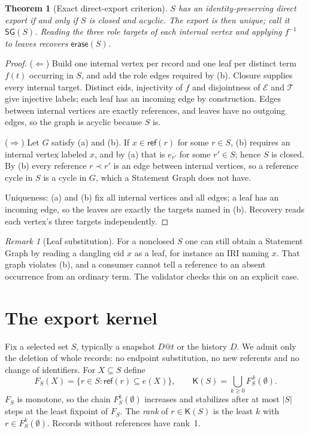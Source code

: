 \documentclass[11pt]{article}
\theoremstyle{plain}
\newtheorem{theorem}{Theorem}
\theoremstyle{definition}
\theoremstyle{remark}
\newtheorem{remark}{Remark}
\newcommand{\Stmt}{\mathcal E}
\newcommand{\Term}{\mathcal T}
\newcommand{\SG}{\mathsf{SG}}
\newcommand{\refs}{\prec}
\newcommand{\Kernel}{\mathsf{K}}
\newcommand{\Erase}{\mathsf{erase}}
\newcommand{\refset}{\mathsf{ref}}
\begin{document}
\begin{theorem}[Exact direct-export criterion]\label{thm:criterion}
$S$ has an identity-preserving direct export if and only if $S$ is closed and
acyclic. The export is then unique; call it $\SG(S)$. Reading the three role
targets of each internal vertex and applying $f^{-1}$ to leaves recovers
$\Erase(S)$.
\end{theorem}
\begin{proof}
($\Leftarrow$) Build one internal vertex per record and one leaf per distinct term
$f(t)$ occurring in $S$, and add the role edges required by (b). Closure supplies
every internal target. Distinct eids, injectivity of $f$ and disjointness of $\Stmt$
and $\Term$ give injective labels; each leaf has an incoming edge by construction.
Edges between internal vertices are exactly references, and leaves have no
outgoing edges, so the graph is acyclic because $S$ is.

($\Rightarrow$) Let $G$ satisfy (a) and (b). If $x\in\refset(r)$ for some $r\in S$,
(b) requires an internal vertex labeled $x$, and by (a) that is $e_{r'}$ for some
$r'\in S$; hence $S$ is closed. By (b) every reference $r\refs r'$ is an edge
between internal vertices, so a reference cycle in $S$ is a cycle in $G$, which a
Statement Graph does not have.

Uniqueness: (a) and (b) fix all internal vertices and all edges; a leaf has an
incoming edge, so the leaves are exactly the targets named in (b). Recovery reads
each vertex's three targets independently.
\end{proof}

\begin{remark}[Leaf substitution]
For a nonclosed $S$ one can still obtain a Statement Graph by reading a dangling eid
$x$ as a leaf, for instance an IRI naming $x$. That graph violates (b), and a
consumer cannot tell a reference to an absent occurrence from an ordinary term. The
validator checks this on an explicit case.
\end{remark}

\section{The export kernel}\label{sec:kernel}
Fix a selected set $S$, typically a snapshot $D@t$ or the history $D$. We admit
only the deletion of whole records: no endpoint substitution, no new referents and
no change of identifiers. For $X\subseteq S$ define
\[
F_S(X)=\{r\in S:\refset(r)\subseteq e(X)\},
\qquad
\Kernel(S)=\bigcup_{k\ge0}F_S^{\,k}(\emptyset).
\]
$F_S$ is monotone, so the chain $F_S^k(\emptyset)$ increases and stabilizes after at
most $|S|$ steps at the least fixpoint of $F_S$. The \emph{rank} of $r\in\Kernel(S)$
is the least $k$ with $r\in F_S^k(\emptyset)$. Records without references have
rank~1.
\end{document}
